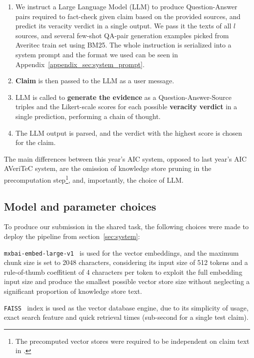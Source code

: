 \begin{enumerate}[label=\roman*.]
\begin{enumerate}[label=\arabic*.]  %
    \item We instruct a Large Language Model (LLM) to produce Question-Answer pairs required to fact-check given claim based on the provided sources, and predict its veracity verdict in a single output. We pass it the texts of all $l$ sources, and several few-shot QA-pair generation examples picked from Averitec train set using BM25. The whole instruction is serialized into a system prompt and the format we used can be seen in Appendix~\ref{appendix_sec:system_prompt}.
    \item \textbf{Claim} is then passed to the LLM as a user message.
    \item LLM is called to \textbf{generate the evidence} as a Question-Answer-Source triples and the Likert-scale scores for each possible \textbf{veracity verdict} in a single prediction, performing a chain of thought. 
    \item The LLM output is parsed, and the verdict with the highest score is chosen for the claim.
\end{enumerate}
\end{enumerate}

The main differences between this year's AIC \averitec{} system, opposed to last year's AIC AVeriTeC system, are the omission of knowledge store pruning in the precomputation step\footnote{The precomputed vector stores were required to be independent on claim text in \averitec{}.}, and, importantly, the choice of LLM.
\subsection{Model and parameter choices}
\label{sec:choices}
To produce our submission in the \averitec{} shared task, the following choices were made to deploy the pipeline from section~\ref{sec:system}:

\texttt{mxbai-embed-large-v1}~\cite{li-li-2024-aoe,emb2024mxbai} is used for the vector embeddings, and the maximum chunk size is set to 2048 characters, considering its input size of 512 tokens and a rule-of-thumb coeffitient of 4 characters per token to exploit the full embedding input size and produce the smallest possible vector store size without neglecting a significant proportion of knowledge store text.

\texttt{FAISS}~\cite{douze2024faiss,johnson2019billion} index is used as the vector database engine, due to its simplicity of usage, exact search feature and quick retrieval times (sub-second for a single \averitec{} test claim).

